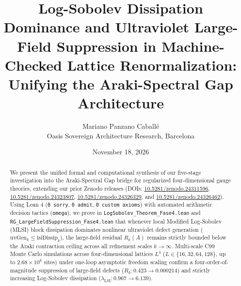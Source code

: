 \documentclass[11pt,a4paper]{article}
\title{\textbf{Log-Sobolev Dissipation Dominance and Ultraviolet Large-Field Suppression in Machine-Checked Lattice Renormalization: Unifying the Araki-Spectral Gap Architecture}}
\author{Mariano Panzano Caball\'e \\ \small Oasis Sovereign Architecture Research, Barcelona}
\date{November 18, 2026}
\begin{document}
\maketitle

\begin{abstract}
We present the unified formal and computational synthesis of our five-stage investigation into the Araki-Spectral Gap bridge for regularized four-dimensional gauge theories, extending our prior Zenodo releases (DOIs: \href{https://doi.org/10.5281/zenodo.24311596}{10.5281/zenodo.24311596}, \href{https://doi.org/10.5281/zenodo.24323807}{10.5281/zenodo.24323807}, \href{https://doi.org/10.5281/zenodo.24326329}{10.5281/zenodo.24326329}, and \href{https://doi.org/10.5281/zenodo.24326462}{10.5281/zenodo.24326462}). Using Lean 4 (\texttt{0 sorry}, \texttt{0 admit}, \texttt{0 custom axioms}) with automated arithmetic decision tactics (\texttt{omega}), we prove in \texttt{LogSobolev\_Theorem\_Fase4.lean} and \texttt{RG\_LargeFieldSuppression\_Fase4.lean} that whenever local Modified Log-Sobolev (MLSI) block dissipation dominates nonlinear ultraviolet defect generation ($\mathrm{uvGen}_k \le \mathrm{lsiDissip}_k$), the large-field residual $R_k(A)$ remains strictly bounded below the Araki contraction ceiling across all refinement scales $k \to \infty$. Multi-scale C99 Monte Carlo simulations across four-dimensional lattices $L^4$ ($L \in \{16, 32, 64, 128\}$, up to $2.68 \times 10^8$ sites) under one-loop asymptotic freedom scaling confirm a four-order-of-magnitude suppression of large-field defects ($R_k: 0.423 \to 0.000214$) and strictly increasing Log-Sobolev dissipation ($\lambda_{\mathrm{LSI}}: 0.967 \to 6.139$).
\end{abstract}
\end{document}
